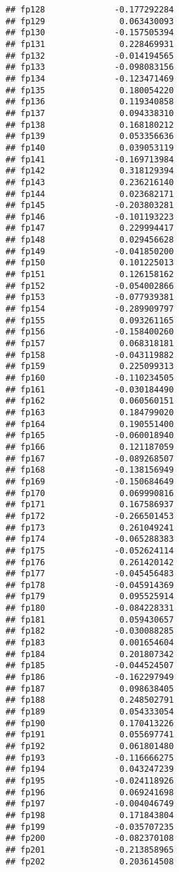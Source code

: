 \documentclass[]{article}
\begin{document}
\begin{verbatim}
## fp128              -0.177292284
## fp129               0.063430093
## fp130              -0.157505394
## fp131               0.228469931
## fp132              -0.014194565
## fp133              -0.098083156
## fp134              -0.123471469
## fp135               0.180054220
## fp136               0.119340858
## fp137               0.094338310
## fp138               0.168180212
## fp139               0.053356636
## fp140               0.039053119
## fp141              -0.169713984
## fp142               0.318129394
## fp143               0.236216140
## fp144               0.023682171
## fp145              -0.203803281
## fp146              -0.101193223
## fp147               0.229994417
## fp148               0.029456628
## fp149              -0.041850200
## fp150               0.101225013
## fp151               0.126158162
## fp152              -0.054002866
## fp153              -0.077939381
## fp154              -0.289909797
## fp155               0.093261165
## fp156              -0.158400260
## fp157               0.068318181
## fp158              -0.043119882
## fp159               0.225099313
## fp160              -0.110234505
## fp161              -0.030184490
## fp162               0.060560151
## fp163               0.184799020
## fp164               0.190551400
## fp165              -0.060018940
## fp166               0.121187059
## fp167              -0.089268507
## fp168              -0.138156949
## fp169              -0.150684649
## fp170               0.069990816
## fp171               0.167586937
## fp172              -0.266501453
## fp173               0.261049241
## fp174              -0.065288383
## fp175              -0.052624114
## fp176               0.261420142
## fp177              -0.045456483
## fp178              -0.045914369
## fp179               0.095525914
## fp180              -0.084228331
## fp181               0.059430657
## fp182              -0.030088285
## fp183               0.001654604
## fp184               0.201807342
## fp185              -0.044524507
## fp186              -0.162297949
## fp187               0.098638405
## fp188               0.248502791
## fp189               0.054333054
## fp190               0.170413226
## fp191               0.055697741
## fp192               0.061801480
## fp193              -0.116666275
## fp194               0.043247239
## fp195              -0.024118926
## fp196               0.069241698
## fp197              -0.004046749
## fp198               0.171843804
## fp199              -0.035707235
## fp200              -0.082370108
## fp201              -0.213858965
## fp202               0.203614508

\end{verbatim}
\end{document}
